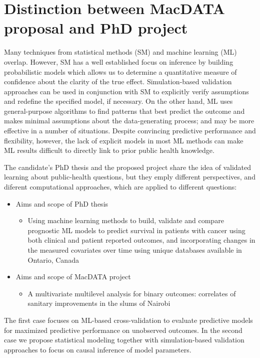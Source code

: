 \documentclass[12pt]{article}
\begin{document}
\section*{Distinction between MacDATA proposal and PhD project}

Many techniques from statistical methods (SM) and machine learning (ML) overlap. However, SM has a well established focus on inference by building probabilistic models which allows us to determine a quantitative measure of confidence about the clarity of the true effect. Simulation-based validation approaches can be used in conjunction with SM to explicitly verify assumptions and redefine the specified model, if necessary. On the other hand, ML uses general-purpose algorithms to find patterns that best predict the outcome and makes minimal assumptions about the data-generating process; and may be more effective in a number of situations. Despite convincing predictive performance and flexibility, however, the lack of explicit models in most ML methods can make ML results difficult to directly link to prior public health knowledge.

The candidate's PhD thesis and the proposed project share the idea of validated learning about public-health questions, but they emply different perspectives, and diferent computational approaches, which are applied to different questions:

\begin{itemize}
\item Aims and scope of PhD thesis
\begin{itemize}
\item Using machine learning methods to build, validate and compare prognostic ML models to predict survival in patients with cancer using both clinical and patient reported outcomes, and incorporating changes in the measured covariates over time using unique databases available in Ontario, Canada
\end{itemize}
\item Aims and scope of MacDATA project
\begin{itemize}
\item A multivariate multilevel analysis for binary outcomes: correlates of sanitary improvements in the slums of Nairobi
\end{itemize}
\end{itemize}
The first case focuses on ML-based cross-validation to evaluate predictive models for maximized predictive performance on unobserved outcomes. In the second case we propose statistical modeling together with simulation-based validation approaches to focus on causal inference of model parameters.
\end{document}
